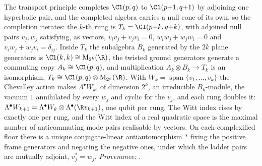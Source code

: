 The transport principle completes $\Cl(p,q)$ to $\Cl(p{+}1,q{+}1)$ by adjoining one hyperbolic pair, and the completed algebra carries a null cone of its own, so the completion iterates: the $k$-th rung is $T_{k} = \Cl(p{+}k, q{+}k)$, with adjoined null pairs $v_{j}, w_{j}$ satisfying, as vectors, $v_{i}v_{j} + v_{j}v_{i} = 0$, $w_{i}w_{j} + w_{j}w_{i} = 0$ and $v_{i}w_{j} + w_{j}v_{i} = \delta_{ij}$. Inside $T_{k}$ the subalgebra $B_{k}$ generated by the $2k$ plane generators is $\Cl(k,k) \cong \mathrm{M}_{2^{k}}(\R)$, the twisted ground generators generate a commuting copy $A_{k} \cong \Cl(p,q)$, and multiplication $A_{k} \otimes B_{k} \to T_{k}$ is an isomorphism, $T_{k} \cong \Cl(p,q) \otimes \mathrm{M}_{2^{k}}(\R)$. With $W_{k} = \operatorname{span}\{v_{1}, \ldots, v_{k}\}$ the Chevalley action makes $\Lambda^{\bullet}W_{k}$, of dimension $2^{k}$, an irreducible $B_{k}$-module, the vacuum $1$ annihilated by every $w_{j}$ and cyclic for the $v_{j}$, and each rung doubles it: $\Lambda^{\bullet}W_{k+1} = \Lambda^{\bullet}W_{k} \otimes \Lambda^{\bullet}(\R v_{k+1})$, one qubit per rung. The Witt index rises by exactly one per rung, and the Witt index of a real quadratic space is the maximal number of anticommuting mode pairs realisable by vectors. On each complexified floor there is a unique conjugate-linear antiautomorphism $*$ fixing the positive frame generators and negating the negative ones, under which the ladder pairs are mutually adjoint, $v_{j}^{*} = w_{j}$. \emph{Provenance:} \cite[Def.~2.2, Thm.~3.2, Prop.~4.1, Thms.~4.2, 4.3, Lem.~5.4]{ButlerT3}.
